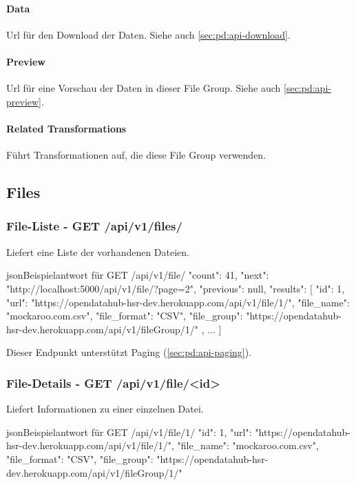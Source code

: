\paragraph{Data} Url für den Download der Daten. Siehe auch \cref{sec:pd:api-download}.
\paragraph{Preview} Url für eine Vorschau der Daten in dieser File Group. Siehe auch \cref{sec:pd:api-preview}.
\paragraph{Related Transformations} Führt Transformationen auf, die diese File Group verwenden.

\subsection{Files} \label{sec:pd:api-files}
\subsubsection{File-Liste - GET /api/v1/files/}
Liefert eine Liste der vorhandenen Dateien.

\begin{srclst}{json}{Beispielantwort für GET /api/v1/file/}
{
    "count": 41, 
    "next": "http://localhost:5000/api/v1/file/?page=2", 
    "previous": null, 
    "results": [
        {
          "id": 1, 
          "url": "https://opendatahub-hsr-dev.herokuapp.com/api/v1/file/1/", 
          "file_name": "mockaroo.com.csv", 
          "file_format": "CSV", 
          "file_group": "https://opendatahub-hsr-dev.herokuapp.com/api/v1/fileGroup/1/"
        }, 
        ...
    ]
}
\end{srclst}

Dieser Endpunkt unterstützt Paging (\cref{sec:pd:api-paging}).

\subsubsection{File-Details - GET /api/v1/file/<id>}
Liefert Informationen zu einer einzelnen Datei.

\begin{srclst}{json}{Beispielantwort für GET /api/v1/file/1/}
{
    "id": 1, 
    "url": "https://opendatahub-hsr-dev.herokuapp.com/api/v1/file/1/", 
    "file_name": "mockaroo.com.csv", 
    "file_format": "CSV", 
    "file_group": "https://opendatahub-hsr-dev.herokuapp.com/api/v1/fileGroup/1/"
}
\end{srclst}


